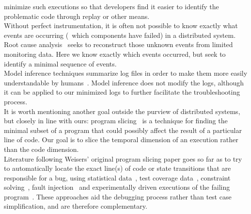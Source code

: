 minimize such executions so that developers find it easier to identify the
problematic code through replay or other means.\\[0.5ex]
%
 Without perfect instrumentation,
it is often not possible to know exactly what events are occurring (\eg~which
components have failed) in a
distributed system. Root cause analysis~\cite{yemini1996,Kandula:2009:DDE:1592568.1592597}
seeks to reconstruct those unknown events from limited monitoring data.
Here we know exactly which events occurred, but
seek to identify a minimal sequence of events.\\[0.5ex]
%
 Model inference techniques summarize log files
in order to make them more easily understandable by
humans~\cite{synoptic,csight,biermann1972synthesis,lorenzoli2008automatic,lou2010mining}.
Model inference does not modify the logs, although
it can be applied to our minimized logs to further facilitate the
troubleshooting process.\\[0.5ex]
%
 It is worth mentioning another goal outside the purview of distributed systems, but
closely in line with ours: program slicing~\cite{weiser1981program} is a
technique for finding the
minimal subset of a program that could possibly affect the result of a particular line of code.
Our goal is to slice the temporal dimension of an execution rather than the
code dimension.\\[0.5ex]
%
 Literature following Weisers' original program
slicing paper goes so far as to try to
automatically locate the exact line(s) of code or state transitions that are responsible for a
bug, using statistical data~\cite{zhangzhang}, test coverage
data~\cite{coverage_localization,xuan14}, constraint solving~\cite{jose11},
fault injection~\cite{zhang13} and
experimentally driven executions of the failing program~\cite{zeller2005,comparative_causality}.
These approaches aid the debugging process rather than test case
simplification,
and are therefore complementary.
